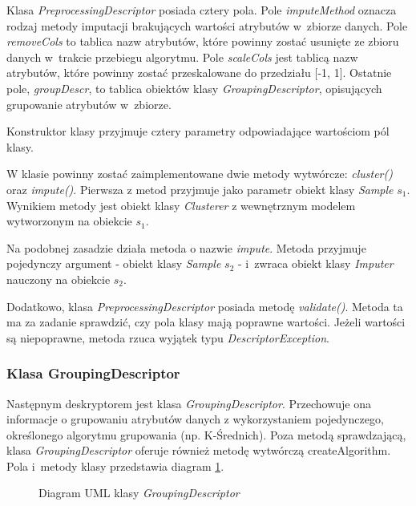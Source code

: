 \documentclass[../thesis.tex]{subfiles}
\begin{document}
Klasa \emph{PreprocessingDescriptor} posiada cztery pola. Pole \emph{imputeMethod} oznacza rodzaj metody imputacji brakujących wartości atrybutów w~zbiorze danych. Pole \emph{removeCols} to tablica nazw atrybutów, które powinny zostać usunięte ze zbioru danych w~trakcie przebiegu algorytmu. Pole \emph{scaleCols} jest tablicą nazw atrybutów, które powinny zostać przeskalowane do przedziału [-1, 1]. Ostatnie pole, \emph{groupDescr}, to tablica obiektów klasy \emph{GroupingDescriptor}, opisujących grupowanie atrybutów w~zbiorze.

Konstruktor klasy przyjmuje cztery parametry odpowiadające wartościom pól klasy.

W klasie powinny zostać zaimplementowane dwie metody wytwórcze: \emph{cluster()} oraz \emph{impute()}. Pierwsza z metod przyjmuje jako parametr obiekt klasy \emph{Sample} $s_1$. Wynikiem metody jest obiekt klasy \emph{Clusterer} z wewnętrznym modelem wytworzonym na obiekcie $s_1$. 

Na podobnej zasadzie działa metoda o nazwie \emph{impute}. Metoda przyjmuje pojedynczy argument - obiekt klasy \emph{Sample} $s_2$ - i~zwraca obiekt klasy \emph{Imputer} nauczony na obiekcie $s_2$.

Dodatkowo, klasa \emph{PreprocessingDescriptor} posiada metodę \emph{validate()}. Metoda ta ma za zadanie sprawdzić, czy pola klasy mają poprawne wartości. Jeżeli wartości są niepoprawne, metoda rzuca wyjątek typu \emph{DescriptorException}.

\subsubsection{Klasa GroupingDescriptor}

Następnym deskryptorem jest klasa \emph{GroupingDescriptor}. Przechowuje ona informacje o grupowaniu atrybutów danych z wykorzystaniem pojedynczego, określonego algorytmu grupowania (np. K-Średnich). Poza metodą sprawdzającą, klasa \emph{GroupingDescriptor} oferuje również metodę wytwórczą createAlgorithm. Pola i~metody klasy przedstawia diagram \ref{proj:diagram_grouping_descriptor}.

\begin{figure}[h]
\centering
{}
\caption{Diagram UML klasy \emph{GroupingDescriptor}}
\label{proj:diagram_grouping_descriptor}
\end{figure}
\end{document}
